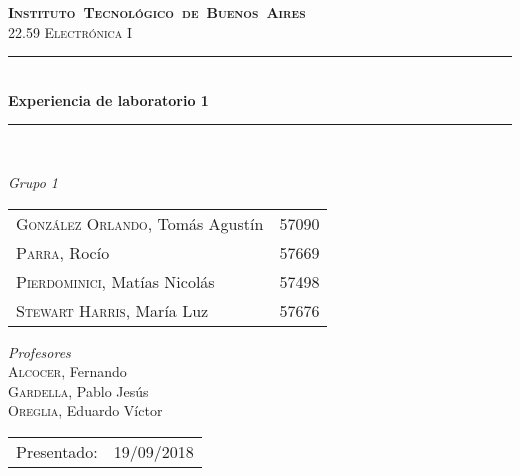 \begin{titlepage}
\newcommand{\HRule}{\rule{\linewidth}{0.5mm}}
\center
\mbox{\textsc{\LARGE \bfseries {Instituto Tecnol\'ogico de Buenos Aires}}}\\[1.5cm]
\textsc{\Large 22.59 Electr\'onica I}\\[0.5cm]


\HRule \\[0.6cm]
{ \Huge \bfseries Experiencia de laboratorio 1}\\[0.4cm] %
\HRule \\[1.5cm]


{\large

\emph{Grupo 1}\\
\vspace{3px}

\begin{tabular}{lr} 	
\textsc{Gonz\'alez Orlando}, Tom\'as Agust\'in  & 57090 \\
\textsc{Parra}, Roc\'io  & 57669 \\ 	
\textsc{Pierdominici}, Mat\'ias Nicol\'as & 57498 \\     
\textsc{Stewart Harris}, Mar\'ia Luz  & 57676  	
\end{tabular}

\vspace{20px}

\emph{Profesores}\\
\vspace{3px}
\textsc{Alcocer,} Fernando\\ 	
\textsc{Gardella,} Pablo Jes\'us\\
\textsc{Oreglia,} Eduardo V\'ictor \\

\vspace{100px}

\begin{tabular}{ll}

Presentado: & 19/09/2018\\

\end{tabular}

}

\vfill

\end{titlepage}